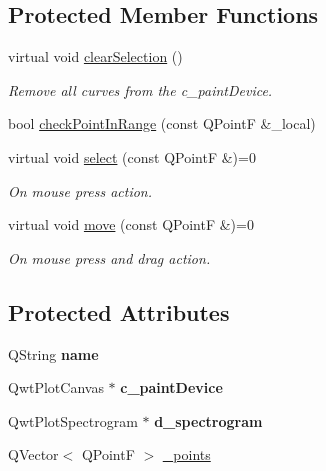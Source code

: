 \subsection*{Protected Member Functions}
\begin{DoxyCompactItemize}
\item 
\mbox{\label{classTool_a11f1da4092d196a7b91d3d60276586eb}} 
virtual void \mbox{\hyperlink{classTool_a11f1da4092d196a7b91d3d60276586eb}{clear\+Selection}} ()
\begin{DoxyCompactList}\small\item\em Remove all curves from the c\+\_\+paint\+Device. \end{DoxyCompactList}\item 
bool \mbox{\hyperlink{classTool_a81244366dc1b9f55465ed6f37b81033c}{check\+Point\+In\+Range}} (const Q\+PointF \&\+\_\+local)
\item 
\mbox{\label{classTool_a453549f925313d28b19fc9a81aabfe01}} 
virtual void \mbox{\hyperlink{classTool_a453549f925313d28b19fc9a81aabfe01}{select}} (const Q\+PointF \&)=0
\begin{DoxyCompactList}\small\item\em On mouse press action. \end{DoxyCompactList}\item 
\mbox{\label{classTool_a734b60b6ecf4b9fa2e56186349a5a3cf}} 
virtual void \mbox{\hyperlink{classTool_a734b60b6ecf4b9fa2e56186349a5a3cf}{move}} (const Q\+PointF \&)=0
\begin{DoxyCompactList}\small\item\em On mouse press and drag action. \end{DoxyCompactList}\end{DoxyCompactItemize}
\subsection*{Protected Attributes}
\begin{DoxyCompactItemize}
\item 
\mbox{\label{classTool_af0935d8e8edd73d8ec85424b5b15196b}} 
Q\+String {\bfseries name}
\item 
\mbox{\label{classTool_a1e301a03c5806c900786760d80049380}} 
Qwt\+Plot\+Canvas $\ast$ {\bfseries c\+\_\+paint\+Device}
\item 
\mbox{\label{classTool_af1d11cc5374ba7eb7c1d41cfb5d4e981}} 
Qwt\+Plot\+Spectrogram $\ast$ {\bfseries d\+\_\+spectrogram}
\item 
Q\+Vector$<$ Q\+PointF $>$ \mbox{\hyperlink{classTool_a68be77a2e364a7b13d7206388ba5843e}{\+\_\+points}}
\end{DoxyCompactItemize}


